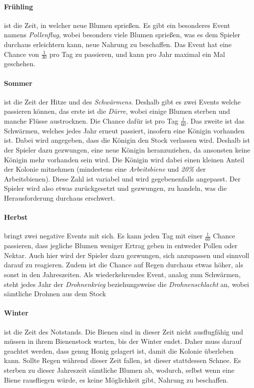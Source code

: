 \paragraph{Frühling} ist die Zeit, in welcher neue Blumen sprießen. Es gibt ein besonderes Event namens \textit{Pollenflug}, wobei besonders viele Blumen sprießen, was es dem Spieler durchaus erleichtern kann, neue Nahrung zu beschaffen. Das Event hat eine Chance von $\frac{1}{30}$ pro Tag zu passieren, und kann pro Jahr maximal ein Mal geschehen.

\paragraph{Sommer} ist die Zeit der Hitze und des \textit{Schwärmens}. Deshalb gibt es zwei Events welche passieren können, das erste ist die \textit{Dürre}, wobei einige Blumen sterben und manche Flüsse austrocknen. Die Chance dafür ist pro Tag $\frac{1}{60}$. Das zweite ist das Schwärmen, welches jedes Jahr erneut passiert, insofern eine Königin vorhanden ist. Dabei wird angegeben, dass die Königin den Stock verlassen wird. Deshalb ist der Spieler dazu gezwungen, eine neue Königin heranzuziehen, da ansonsten keine Königin mehr vorhanden sein wird. Die Königin wird dabei einen kleinen Anteil der Kolonie mitnehmen (mindestens eine \textit{Arbeitsbiene} und \textit{20\%} der Arbeitsbienen). Diese Zahl ist variabel und wird gegebenenfalls angepasst. Der Spieler wird also etwas zurückgesetzt und gezwungen, zu handeln, was die Herausforderung durchaus erschwert. 

\paragraph{Herbst} bringt zwei negative Events mit sich. Es kann jeden Tag mit einer $\frac{1}{60}$ Chance passieren, dass jegliche Blumen weniger Ertrag geben in entweder Pollen oder Nektar. Auch hier wird der Spieler dazu gezwungen, sich anzupassen und sinnvoll darauf zu reagieren. Zudem ist die Chance auf Regen durchaus etwas höher, als sonst in den Jahreszeiten. Als wiederkehrendes Event, analog zum Schwärmen, steht jedes Jahr der \textit{Drohnenkrieg} beziehungsweise die \textit{Drohnenschlacht} an, wobei sämtliche Drohnen aus dem Stock 

\paragraph{Winter} ist die Zeit des Notstands. Die Bienen sind in dieser Zeit nicht ausflugfähig und müssen in ihrem Bienenstock warten, bis der Winter endet. Daher muss darauf geachtet werden, dass genug Honig gelagert ist, damit die Kolonie überleben kann. Sollte Regen während dieser Zeit fallen, ist dieser stattdessen Schnee. Es sterben zu dieser Jahreszeit sämtliche Blumen ab, wodurch, selbst wenn eine Biene rausfliegen würde, es keine Möglichkeit gibt, Nahrung zu beschaffen.


